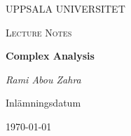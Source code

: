 \begin{titlepage}

  \centering
	{\scshape\LARGE UPPSALA UNIVERSITET\par}
	\vspace{1cm}
  {\scshape\Large {Lecture Notes} \par}
	\vspace{1.5cm}
  {\huge\bfseries {Complex Analysis} \par}
	\vspace{2cm}
	{\Large\itshape Rami Abou Zahra \par}
	\vfill
  \vfill


  {\large Inlämningsdatum}\par
  {\today}

\end{titlepage}
